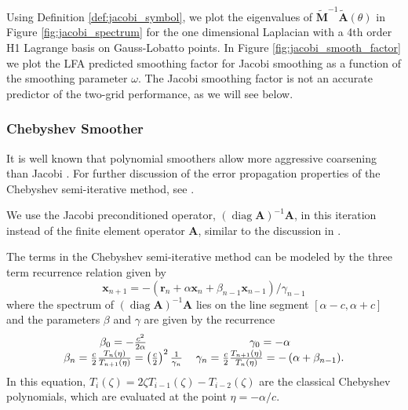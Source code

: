 \documentclass[review]{siamart190516}
\DeclareMathOperator{\diag}{diag}
\begin{document}
Using Definition \ref{def:jacobi_symbol}, we plot the eigenvalues of $\tilde{\mathbf{M}}^{-1} \tilde{\mathbf{A}} \left( \theta \right)$ in Figure \ref{fig:jacobi_spectrum} for the one dimensional Laplacian with a 4th order H1 Lagrange basis on Gauss-Lobatto points.
In Figure \ref{fig:jacobi_smooth_factor} we plot the LFA predicted smoothing factor for Jacobi smoothing as a function of the smoothing parameter $\omega$.
The Jacobi smoothing factor is not an accurate predictor of the two-grid performance, as we will see below.

\subsubsection{Chebyshev Smoother}\label{sec:chebyshev}

It is well known that polynomial smoothers allow more aggressive coarsening than Jacobi \cite{brannick2015polynomial}.
For further discussion of the error propagation properties of the Chebyshev semi-iterative method, see \cite{gutknecht2002revisited}.

We use the Jacobi preconditioned operator, $\left( \diag {\mathbf{A}} \right)^{-1} {\mathbf{A}}$, in this iteration instead of the finite element operator ${\mathbf{A}}$, similar to the discussion in \cite{adams2003parallel}.

The terms in the Chebyshev semi-iterative method can be modeled by the three term recurrence relation given by
\begin{equation}
\mathbf{x}_{n + 1} = - \left( \mathbf{r}_n + \alpha \mathbf{x}_n + \beta_{n - 1} \mathbf{x}_{n - 1} \right) / \gamma_{n - 1}
\label{eq:chebyshev_recursive}
\end{equation}
where the spectrum of $\left( \diag {\mathbf{A}} \right)^{-1} {\mathbf{A}}$ lies on the line segment $\left[ \alpha - c, \alpha + c \right]$ and the parameters $\beta$ and $\gamma$ are given by the recurrence
\begin{equation}
\begin{tabular}{c c}
$\beta_0 = - \frac{c^2}{2 \alpha}$ & $\gamma_0 = - \alpha$\\
$\beta_n = \frac{c}{2} \frac{T_n \left( \eta \right)}{T_{n + 1} \left( \eta \right)} = \left( \frac{c}{2} \right)^2 \frac{1}{\gamma_n}$ & $\gamma_n = \frac{c}{2} \frac{T_{n + 1} \left( \eta \right)}{T_n \left( \eta \right)} = - \left( \alpha + \beta_{n - 1} \right)$.
\end{tabular}
\end{equation}
In this equation, $T_i \left( \zeta \right) = 2 \zeta T_{i - 1} \left( \zeta \right) - T_{i - 2} \left( \zeta \right)$ are the classical Chebyshev polynomials, which are evaluated at the point $\eta = - \alpha / c$.
\end{document}
